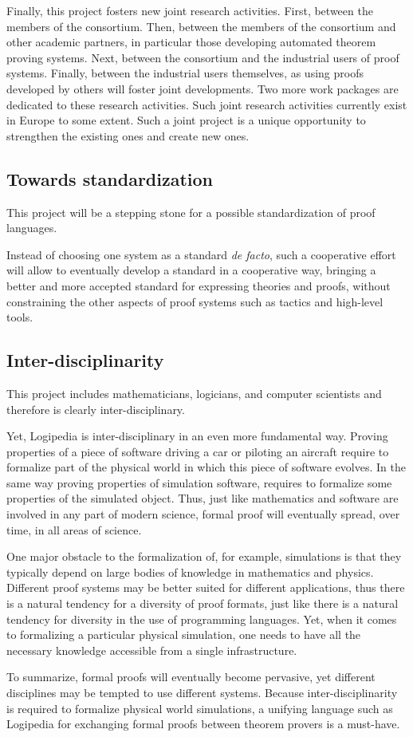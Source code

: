 Finally, this project fosters new joint research activities. First,
between the members of the consortium. Then, between the members of
the consortium and other academic partners, in particular those
developing automated theorem proving systems. Next, between the
consortium and the industrial users of proof systems. Finally, between
the industrial users themselves, as using proofs developed by others
will foster joint developments. Two more work packages are dedicated
to these research activities.  Such joint research activities
currently exist in Europe to some extent.  Such a joint project is a
unique opportunity to strengthen the existing ones and create new
ones.

\subsection{Towards standardization}
This project will be a stepping stone for a possible standardization
of proof languages.

Instead of choosing one system as a standard {\em de facto}, such a
cooperative effort will allow to eventually develop a standard in a
cooperative way, bringing a better and more accepted standard for
expressing theories and proofs, without constraining the other aspects
of proof systems such as tactics and high-level tools.

\subsection{Inter-disciplinarity}
This project includes mathematicians, logicians, and computer
scientists and therefore is clearly inter-disciplinary.

Yet, Logipedia is inter-disciplinary in an even more fundamental
way. Proving properties of a piece of software driving a car or
piloting an aircraft require to formalize part of the physical world
in which this piece of software evolves. In the same way proving
properties of simulation software, requires to formalize some
properties of the simulated object.  Thus, just like mathematics and
software are involved in any part of modern science, formal proof will
eventually spread, over time, in all areas of science.

One major obstacle to the formalization of, for example, simulations
is that they typically depend on large bodies of knowledge in
mathematics and physics.  Different proof systems may be better
suited for different applications, thus there is a natural tendency
for a diversity of proof formats, just like there is a natural
tendency for diversity in the use of programming languages.  Yet, when
it comes to formalizing a particular physical simulation, one needs to
have all the necessary knowledge accessible from a single infrastructure.

To summarize, formal proofs will eventually become pervasive, yet
different disciplines may be tempted to use different systems.
Because inter-disciplinarity is required to formalize physical world
simulations, a unifying language such as Logipedia for exchanging
formal proofs between theorem provers is a must-have.

